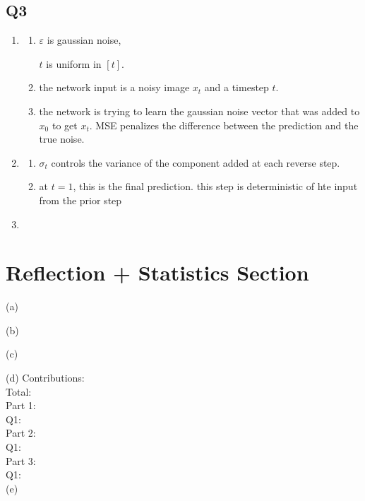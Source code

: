 \documentclass{report}
\begin{document}
\subsection*{Q3}

\begin{enumerate}
    \item \begin{enumerate}
        \item \(\varepsilon\) is gaussian noise, 
        
        \(t\) is uniform in \([t]\).
        \item the network input is a noisy image \(x_t\) and a timestep \(t\). 
        \item the network is trying to learn the gaussian noise vector that was added to \(x_0\) to get \(x_t\). MSE penalizes the difference between the prediction and the true noise.
    \end{enumerate}
    \item \begin{enumerate}
        \item \(\sigma_t\) controls the variance of the component added at each reverse step. 
        \item at \(t=1\), this is the final prediction. this step is deterministic of hte input from the prior step
    \end{enumerate}
    \item 
\end{enumerate}



\section*{Reflection + Statistics Section}
(a)

(b) 

(c) 

(d) 
Contributions: \\

Total: \\

Part 1: \\
Q1: \\

Part 2: \\
Q1: \\

Part 3: \\
Q1: \\

(e)
\end{document}
